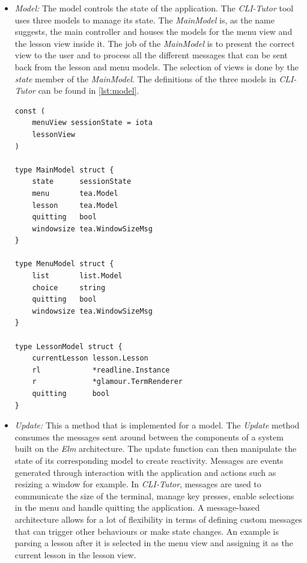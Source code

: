 \begin{itemize}
    \item \textit{Model:} The model controls the state of the application. The 
        \textit{CLI-Tutor} tool uses three models to manage its state. The
        \textit{MainModel} is, as the name suggests, the main controller and
        houses the models for the menu view and the lesson view inside it. The
        job of the \textit{MainModel} is to present the correct view to the
        user and to process all the different messages that can be sent back
        from the lesson and menu models. The selection of views is done by the \textit{state} member of the \textit{MainModel}.  The definitions of the three models in \textit{CLI-Tutor} can be found in \autoref{lst:model}.

\begin{lstlisting}[label=lst:model, frame=single, caption=Models used to build the user interface of \textit{CLI-Tutor} ]
const (
	menuView sessionState = iota
	lessonView
)

type MainModel struct {
	state      sessionState
	menu       tea.Model
	lesson     tea.Model
	quitting   bool
	windowsize tea.WindowSizeMsg
}

type MenuModel struct {
	list       list.Model
	choice     string
	quitting   bool
	windowsize tea.WindowSizeMsg
}

type LessonModel struct {
	currentLesson lesson.Lesson
	rl            *readline.Instance
	r             *glamour.TermRenderer
	quitting      bool
}
\end{lstlisting}

\item \textit{Update:} This a method that is implemented for a model. The
    \textit{Update} method consumes the messages sent around between the
    components of a system built on the \textit{Elm} architecture. The update
    function can then manipulate the state of its corresponding model to
    create reactivity. Messages are events generated through interaction with
    the application and actions such as resizing a window for example. In
    \textit{CLI-Tutor}, messages are used to communicate the size of the
    terminal, manage key presses, enable selections in the menu and handle
    quitting the application. A message-based architecture allows for a lot of
    flexibility in terms of defining custom messages that can trigger other
    behaviours or make state changes. An example is parsing a lesson after it
    is selected in the menu view and assigning it as the current lesson in the
    lesson view.


\end{itemize}
